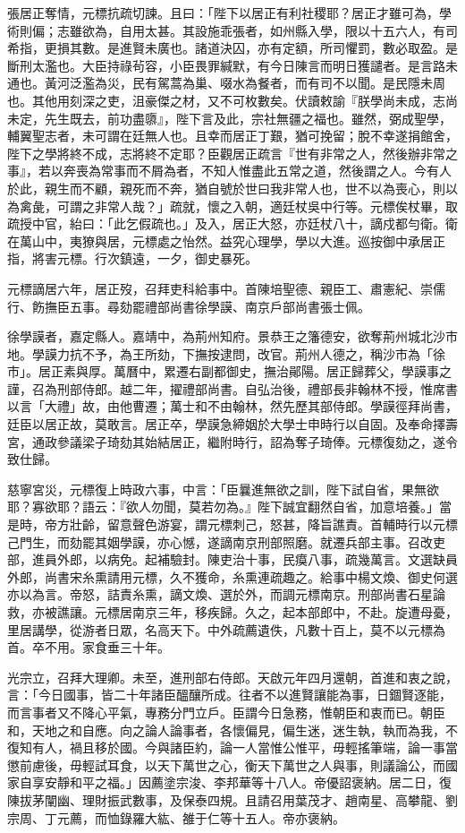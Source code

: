 \begin{pinyinscope}
張居正奪情，元標抗疏切諫。且曰：「陛下以居正有利社稷耶？居正才雖可為，學術則偏；志雖欲為，自用太甚。其設施乖張者，如州縣入學，限以十五六人，有司希指，更損其數。是進賢未廣也。諸道決囚，亦有定額，所司懼罰，數必取盈。是斷刑太濫也。大臣持祿茍容，小臣畏罪緘默，有今日陳言而明日獲譴者。是言路未通也。黃河泛濫為災，民有駕蒿為巢、啜水為餐者，而有司不以聞。是民隱未周也。其他用刻深之吏，沮豪傑之材，又不可枚數矣。伏讀敕諭『朕學尚未成，志尚未定，先生既去，前功盡隳』，陛下言及此，宗社無疆之福也。雖然，弼成聖學，輔翼聖志者，未可謂在廷無人也。且幸而居正丁艱，猶可挽留；脫不幸遂捐館舍，陛下之學將終不成，志將終不定耶？臣觀居正疏言『世有非常之人，然後辦非常之事』，若以奔喪為常事而不屑為者，不知人惟盡此五常之道，然後謂之人。今有人於此，親生而不顧，親死而不奔，猶自號於世曰我非常人也，世不以為喪心，則以為禽彘，可謂之非常人哉？」疏就，懷之入朝，適廷杖吳中行等。元標俟杖畢，取疏授中官，紿曰：「此乞假疏也。」及入，居正大怒，亦廷杖八十，謫戍都勻衛。衛在萬山中，夷獠與居，元標處之怡然。益究心理學，學以大進。巡按御中承居正指，將害元標。行次鎮遠，一夕，御史暴死。

元標謫居六年，居正歿，召拜吏科給事中。首陳培聖德、親臣工、肅憲紀、崇儒行、飭撫臣五事。尋劾罷禮部尚書徐學謨、南京戶部尚書張士佩。

徐學謨者，嘉定縣人。嘉靖中，為荊州知府。景恭王之籓德安，欲奪荊州城北沙市地。學謨力抗不予，為王所劾，下撫按逮問，改官。荊州人德之，稱沙市為「徐市」。居正素與厚。萬曆中，累遷右副都御史，撫治鄖陽。居正歸葬父，學謨事之謹，召為刑部侍郎。越二年，擢禮部尚書。自弘治後，禮部長非翰林不授，惟席書以言「大禮」故，由他曹遷；萬士和不由翰林，然先歷其部侍郎。學謨徑拜尚書，廷臣以居正故，莫敢言。居正卒，學謨急締姻於大學士申時行以自固。及奉命擇壽宮，通政參議梁子琦劾其始結居正，繼附時行，詔為奪子琦俸。元標復劾之，遂令致仕歸。

慈寧宮災，元標復上時政六事，中言：「臣曩進無欲之訓，陛下試自省，果無欲耶？寡欲耶？語云：『欲人勿聞，莫若勿為。』陛下誠宜翻然自省，加意培養。」當是時，帝方壯齡，留意聲色游宴，謂元標刺己，怒甚，降旨譙責。首輔時行以元標己門生，而劾罷其姻學謨，亦心憾，遂謫南京刑部照磨。就遷兵部主事。召改吏部，進員外郎，以病免。起補驗封。陳吏治十事，民瘼八事，疏幾萬言。文選缺員外郎，尚書宋糸熏請用元標，久不獲命，糸熏連疏趣之。給事中楊文煥、御史何選亦以為言。帝怒，詰責糸熏，謫文煥、選於外，而調元標南京。刑部尚書石星論救，亦被譙讓。元標居南京三年，移疾歸。久之，起本部郎中，不赴。旋遭母憂，里居講學，從游者日眾，名高天下。中外疏薦遺佚，凡數十百上，莫不以元標為首。卒不用。家食垂三十年。

光宗立，召拜大理卿。未至，進刑部右侍郎。天啟元年四月還朝，首進和衷之說，言：「今日國事，皆二十年諸臣醞釀所成。往者不以進賢讓能為事，日錮賢逐能，而言事者又不降心平氣，專務分門立戶。臣謂今日急務，惟朝臣和衷而已。朝臣和，天地之和自應。向之論人論事者，各懷偏見，偏生迷，迷生執，執而為我，不復知有人，禍且移於國。今與諸臣約，論一人當惟公惟平，毋輕搖筆端，論一事當懲前慮後，毋輕試耳食，以天下萬世之心，衡天下萬世之人與事，則議論公，而國家自享安靜和平之福。」因薦塗宗浚、李邦華等十八人。帝優詔褒納。居二日，復陳拔茅闡幽、理財振武數事，及保泰四規。且請召用葉茂才、趙南星、高攀龍、劉宗周、丁元薦，而恤錄羅大紘、雒于仁等十五人。帝亦褒納。


\end{pinyinscope}
